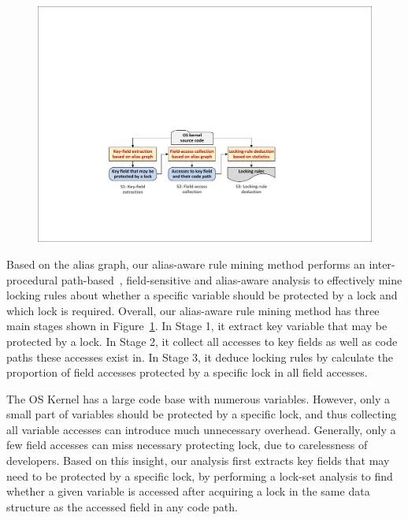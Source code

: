 \begin{figure}[htbp]
	\centering
	\includegraphics[width=1\linewidth]{figures/fig_workflow.pdf}
	\label{fig_workflow}
\end{figure}

Based on the alias graph, our alias-aware rule mining method performs an 
inter-procedural path-based~\cite{Li:ASPLOS22}, field-sensitive and alias-aware 
analysis to effectively mine locking rules about whether a specific variable 
should be protected by a lock and which lock is required. Overall, our 
alias-aware rule mining method has three main stages shown in 
Figure~\ref{fig_workflow}. In Stage 1, it extract key variable that may be 
protected by a lock. In Stage 2, it collect all accesses to key fields as well 
as code paths these accesses exist in. In Stage 3, it deduce locking rules by 
calculate the proportion of field accesses protected by a specific lock in all 
field accesses. 

 The OS Kernel has a large code base with 
numerous variables. However, only a small part of variables should be protected 
by a specific lock, and thus collecting all variable accesses can introduce 
much unnecessary overhead. Generally, only a few field accesses can miss 
necessary protecting lock, due to carelessness of developers. Based on this 
insight, our analysis first extracts key fields that may need to be protected 
by a specific lock, by performing a lock-set analysis to find whether a given 
variable is accessed after acquiring a lock in the same data structure as the 
accessed field in any code path.

